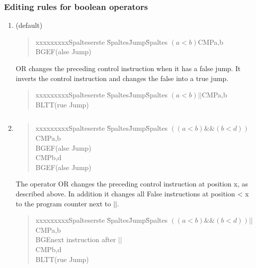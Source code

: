 \subsubsection{Editing rules for boolean operators}
\begin{enumerate}
  \item (default)
  \begin{quote}
	\begin{tabbing}
	xxxxxxxxxSpalteserste \= Spaltes\=  Jump\= Spaltes \kill
	$(a<b)$\>CMP\>a,b\\
	\>BGE\>\>F(alse Jump)\\
	\end{tabbing}
	\end{quote}
OR changes the preceding control instruction when it has a false jump. 
It inverts the control instruction and changes the false into a true
  jump.
    \begin{quote}
	\begin{tabbing}
	xxxxxxxxxSpalteserste \= Spaltes\=  Jump\= Spaltes \kill
	$(a<b) || $\>CMP\>a,b\\
	\>BLT\>\>T(rue Jump)\\
	\end{tabbing}
	\end{quote}
\begin{verbatim}

\end{verbatim}
    \item
    
  \begin{quote}
	\begin{tabbing}
	xxxxxxxxxSpalteserste \= Spaltes\=  Jump\= Spaltes \kill
	$((a<b) \&\&  (b<d))$\>CMP\>a,b\\
	\>BGE\>\>F(alse Jump)\\
	\>CMP\>b,d\\
	\>BGE\>\>F(alse Jump)\\
	\end{tabbing}
	\end{quote}
      The operator OR changes the preceding control instruction at position x, as described above. In addition it changes all False
      instructions at position < x to the program counter next to $||$.  
  \begin{quote}
	\begin{tabbing}
	xxxxxxxxxSpalteserste \= Spaltes\=  Jump\= Spaltes \kill
	$((a<b) \&\&  (b<d))||$\>CMP\>a,b\\
	\>BGE\>\>next instruction after $||$\\
	\>CMP\>b,d\\
	\>BLT\>\>T(rue Jump)\\
	\end{tabbing}
	\end{quote}
\begin{verbatim}


\end{verbatim}
\end{enumerate}
